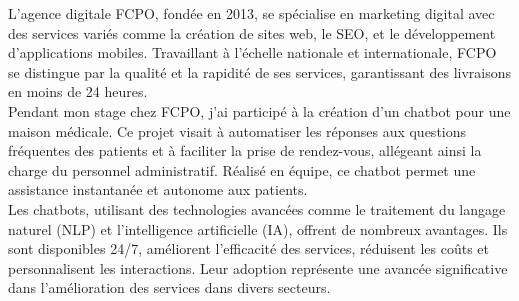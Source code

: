 \hspace{16pt}L'agence digitale FCPO, fondée en 2013, se spécialise en marketing digital avec des services variés comme la création de sites web, le SEO, et le développement d'applications mobiles. Travaillant à l'échelle nationale et internationale, FCPO se distingue par la qualité et la rapidité de ses services, garantissant des livraisons en moins de 24 heures.\\

Pendant mon stage chez FCPO, j'ai participé à la création d'un chatbot pour une maison médicale. Ce projet visait à automatiser les réponses aux questions fréquentes des patients et à faciliter la prise de rendez-vous, allégeant ainsi la charge du personnel administratif. Réalisé en équipe, ce chatbot permet une assistance instantanée et autonome aux patients.\\

Les chatbots, utilisant des technologies avancées comme le traitement du langage naturel (NLP) et l'intelligence artificielle (IA), offrent de nombreux avantages. Ils sont disponibles 24/7, améliorent l'efficacité des services, réduisent les coûts et personnalisent les interactions. Leur adoption représente une avancée significative dans l'amélioration des services dans divers secteurs.\\

